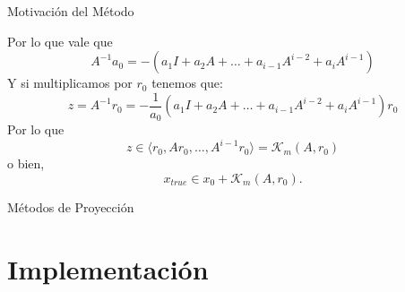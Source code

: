 \documentclass[12pt]{beamer}
\begin{document}
	\begin{frame}{Motivación del Método}
		
		Por lo que vale que $$A^{-1}a_0=-(a_1I+a_2A+\dots+a_{i-1}A^{i-2}+a_iA^{i-1})$$ Y si multiplicamos por $r_0$ tenemos que: $$z=A^{-1}r_0=-\frac{1}{a_0}(a_1I+a_2A+\dots+a_{i-1}A^{i-2}+a_iA^{i-1})r_0$$ Por lo que $$z\in \langle r_0,Ar_0,\dots,A^{i-1}r_0 \rangle = \mathcal{K}_{m}(A, r_0)$$ o bien, $$x_{true} \in x_0 + \mathcal{K}_{m}(A, r_0).$$
		
	\end{frame}
	
	\begin{frame}{Métodos de Proyección}
		
		
	\end{frame}
	
	\section{Implementación}
	
	
	
	
\end{document}
